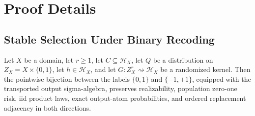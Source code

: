\appendix

\section{Proof Details}\label{sec:proof-details}

\subsection{Stable Selection Under Binary Recoding}\label{app:stable-selection}

\begin{lemma}\label{lem:step-001-binary-recoding}
Let \(X\) be a domain, let \(r\geq 1\), let
\(C\subseteq\mathcal H_X\), let \(Q\) be a
distribution on \(Z_X=X\times\{0,1\}\), let \(h\in\mathcal H_X\), and
let \(G:Z_X^r\rightsquigarrow\mathcal H_X\) be a randomized kernel.
Then the pointwise bijection between the labels \(\{0,1\}\) and
\(\{-1,+1\}\), equipped with the transported output sigma-algebra,
preserves realizability, population zero-one risk, iid product laws,
exact output-atom probabilities, and ordered replacement adjacency in
both directions.
\end{lemma}

